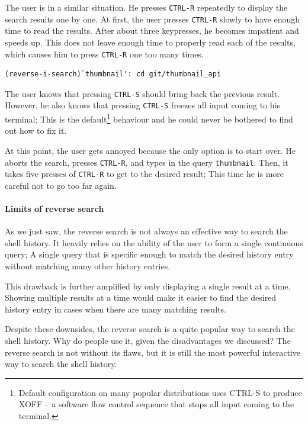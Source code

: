 The user is in a similar situation. He presses \verb|CTRL-R| repeatedly to display the search results one by one. At first, the user presses \verb|CTRL-R| slowly to have enough time to read the results. After about three keypresses, he becomes impatient and speeds up. This does not leave enough time to properly read each of the results, which causes him to press \verb|CTRL-R| one too many times.

\begin{verbatim}
(reverse-i-search)`thumbnail': cd git/thumbnail_api
\end{verbatim}

The user knows that pressing \verb|CTRL-S| should bring back the previous result. However, he also knows that pressing \verb|CTRL-S| freezes all input coming to his terminal; This is the default\footnote{Default configuration on many popular distributions uses CTRL-S to produce XOFF -- a software flow control sequence that stops all input coming to the terminal.} behaviour and he could never be bothered to find out how to fix it.

At this point, the user gets annoyed because the only option is to start over. He aborts the search, presses \verb|CTRL-R|, and types in the query \verb|thumbnail|. Then, it takes five presses of \verb|CTRL-R| to get to the desired result; This time he is more careful not to go too far again.


\paragraph{Limits of reverse search}

As we just saw, the reverse search is not always an effective way to search the shell history. It heavily relies on the ability of the user to form a single continuous query; A single query that is specific enough to match the desired history entry without matching many other history entries. 

This drawback is further amplified by only displaying a single result at a time. Showing multiple results at a time would make it easier to find the desired history entry in cases when there are many matching results. 

Despite these downsides, the reverse search is a quite popular way to search the shell history. Why do people use it, given the disadvantages we discussed? The reverse search is not without its flaws, but it is still the most powerful interactive way to search the shell history. %

